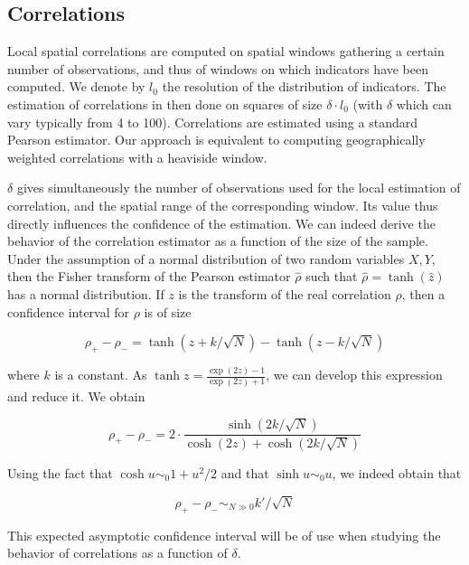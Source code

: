 \documentclass[11pt]{article}
\begin{document}
\subsection{Correlations}

Local spatial correlations are computed on spatial windows gathering a certain number of observations, and thus of windows on which indicators have been computed. We denote by $l_0$ the resolution of the distribution of indicators. The estimation of correlations in then done on squares of size $\delta\cdot l_0$ (with $\delta$ which can vary typically from 4 to 100). Correlations are estimated using a standard Pearson estimator. Our approach is equivalent to computing geographically weighted correlations \citep{brunsdon2002geographically} with a heaviside window.

$\delta$ gives simultaneously the number of observations used for the local estimation of correlation, and the spatial range of the corresponding window. Its value thus directly influences the confidence of the estimation. We can indeed derive the behavior of the correlation estimator as a function of the size of the sample. Under the assumption of a normal distribution of two random variables $X,Y$, then the Fisher transform of the Pearson estimator $\hat{\rho}$ such that $\hat{\rho} = \tanh (\hat{z})$ has a normal distribution. If $z$ is the transform of the real correlation $\rho$, then a confidence interval for $\rho$ is of size

\begin{equation}
\rho_{+} - \rho_{-} = \tanh (z + k / \sqrt{N}) - \tanh (z - k / \sqrt{N})
\end{equation}

where $k$ is a constant. As $\tanh{z} = \frac{\exp (2z) - 1}{\exp (2z) + 1}$, we can develop this expression and reduce it. We obtain


\begin{equation}
	\rho_{+} - \rho_{-} = 2\cdot \frac{\sinh{(2k/\sqrt{N})}}{\cosh{(2z)} + \cosh{(2k/\sqrt{N})}}
\end{equation}


Using the fact that $\cosh u \sim_0 1 + u^2/2$ and that $\sinh u \sim_0 u$, we indeed obtain that 

\begin{equation}
\rho_{+} - \rho_{-} \sim_{N\gg 0} k' / \sqrt{N}
\label{eq:confidenceinterval}
\end{equation}

This expected asymptotic confidence interval will be of use when studying the behavior of correlations as a function of $\delta$.
\end{document}
